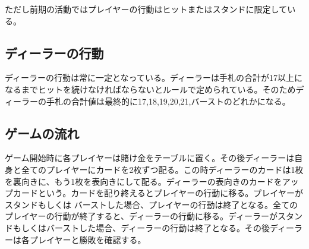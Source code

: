 ただし前期の活動ではプレイヤーの行動はヒットまたはスタンドに限定している。

\subsection{ディーラーの行動}
ディーラーの行動は常に一定となっている。ディーラーは手札の合計が17以上になるまでヒットを続けなければならないとルールで定められている。そのためディーラーの手札の合計値は最終的に17,18,19,20,21,バーストのどれかになる。

\subsection{ゲームの流れ}
ゲーム開始時に各プレイヤーは賭け金をテーブルに置く。その後ディーラーは自身と全てのプレイヤーにカードを2枚ずつ配る。この時ディーラーのカードは1枚を裏向きに、もう1枚を表向きにして配る。ディーラーの表向きのカードをアップカードという。カードを配り終えるとプレイヤーの行動に移る。プレイヤーがスタンドもしくは
バーストした場合、プレイヤーの行動は終了となる。全てのプレイヤーの行動が終了すると、ディーラーの行動に移る。ディーラーがスタンドもしくはバーストした場合、ディーラーの行動は終了となる。その後ディーラーは各プレイヤーと勝敗を確認する。
